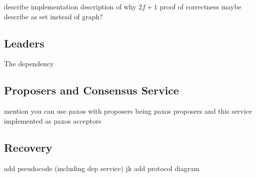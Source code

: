 



describe implementation
description of why $2f+1$
proof of correctness
maybe describe as set instead of graph?

\subsection{Leaders}
The dependency

\subsection{Proposers and Consensus Service}
mention you can use paxos with proposers being paxos proposers and this service
implemented as paxos acceptors


\subsection{Recovery}

add pseudocode (including dep service) jk
add protocol diagram

{}
